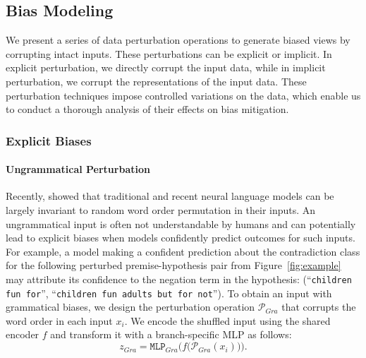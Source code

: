 \subsection{Bias Modeling}\label{sec:biasmodeling}
We present a series of data perturbation operations to generate biased views by corrupting intact inputs. These perturbations can be explicit or implicit. In explicit perturbation, we directly corrupt the input data, while in implicit perturbation, we corrupt the representations of the input data. These perturbation techniques impose controlled variations on the data, which enable us to conduct a thorough analysis of their effects on bias mitigation.




\subsubsection{Explicit Biases} \label{sec:explicit_bias}


\paragraph{Ungrammatical Perturbation} Recently, \citet{sinha-etal-2021-unnatural} showed that traditional and recent neural language models can be largely invariant to random word order permutation in their inputs. 
An ungrammatical input is often not understandable by humans and can potentially lead to explicit biases when models confidently predict outcomes for such inputs. For example, a model making a confident prediction about the contradiction class for the following perturbed premise-hypothesis pair from Figure~\ref{fig:example} may attribute its confidence to the negation term in the hypothesis: (``{\tt children fun for}'', ``{\tt children fun adults but for not}''). 
To obtain an input with grammatical biases, we design the perturbation operation $\mathcal{P}_{Gra}$ that 
corrupts the word order in each input $x_i$. We encode the shuffled input using the shared encoder $f$ and transform it with a branch-specific MLP as follows:
\begin{equation}
    z_{Gra} = \texttt{MLP}_{Gra} \Big( f\big(\mathcal{P}_{Gra}(x_i) \big) \Big).
\end{equation}


